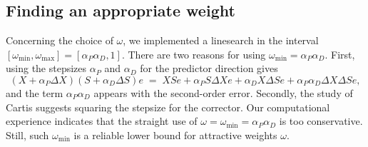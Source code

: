%
%
\subsection{Finding an appropriate weight}

Concerning the choice of $\omega$, we implemented a linesearch in
the interval $[\omega_{\min},\omega_{\max}]=[\alpha_P\alpha_D, 1]$. 
There are two reasons for using  $\omega_{\min} = \alpha_P\alpha_D$. 
First, using the stepsizes $\alpha_P$ and $\alpha_D$ for the predictor
direction gives 
\[
(X + \alpha_P \Delta X) (S + \alpha_D \Delta S) e 
\;=\; XSe + \alpha_P S\Delta Xe + \alpha_D X\Delta Se 
          + \alpha_P\alpha_D \Delta X\Delta S e,
\]
and the term $\alpha_P\alpha_D$ appears with the second-order error. 
Secondly, the study of Cartis \cite{Cartis04} suggests squaring 
the stepsize for the corrector. Our computational experience indicates 
that the straight use of $\omega = \omega_{\min} = \alpha_P\alpha_D$
is too conservative. Still, such $\omega_{\min}$ is a reliable lower 
bound for attractive weights $\omega$. 



